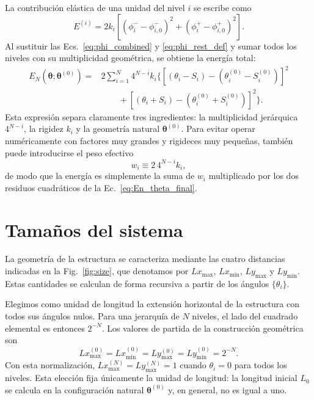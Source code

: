 \documentclass[11pt,a4paper]{article}
\begin{document}
La contribución elástica de una unidad del nivel $i$ se escribe como
\begin{equation}
E^{(i)}
=2k_i\left[
\left(\phi_i^--\phi_{i,0}^-\right)^2
+
\left(\phi_i^+-\phi_{i,0}^+\right)^2
\right].
\label{eq:Ei_phi}
\end{equation}
Al sustituir las Ecs.~\eqref{eq:phi_combined} y
\eqref{eq:phi_rest_def} y sumar todos los niveles con su
multiplicidad geométrica, se obtiene la energía total:
\begin{equation}
\boxed{
\begin{aligned}
E_N(\boldsymbol{\theta};\boldsymbol{\theta}^{(0)})
={}&2\sum_{i=1}^{N}4^{N-i}k_i
\Bigg\{
\left[
(\theta_i-S_i)-(\theta_i^{(0)}-S_i^{(0)})
\right]^2
\\[-0.2em]
&\qquad+
\left[
(\theta_i+S_i)-(\theta_i^{(0)}+S_i^{(0)})
\right]^2
\Bigg\}.
\end{aligned}
}
\label{eq:En_theta_final}
\end{equation}
Esta expresión separa claramente tres ingredientes: la multiplicidad
jerárquica $4^{N-i}$, la rigidez $k_i$ y la geometría natural
$\boldsymbol{\theta}^{(0)}$. Para evitar operar numéricamente con
factores muy grandes y rigideces muy pequeñas, también puede
introducirse el peso efectivo
\begin{equation}
w_i\equiv 2\,4^{N-i}k_i,
\label{eq:effective_weight}
\end{equation}
de modo que la energía es simplemente la suma de $w_i$ multiplicado
por los dos residuos cuadráticos de la Ec.~\eqref{eq:En_theta_final}.

\section{Tamaños del sistema}
\label{sec:size}

La geometría de la estructura se caracteriza mediante las cuatro
distancias indicadas en la Fig.~\ref{fig:size}, que denotamos por
$Lx_{\max}$, $Lx_{\min}$, $Ly_{\max}$ y $Ly_{\min}$.
Estas cantidades se calculan de forma recursiva a partir de los
ángulos $\{\theta_i\}$.

Elegimos como unidad de longitud la extensión horizontal de la
estructura con todos sus ángulos nulos. Para una jerarquía de
$N$ niveles, el lado del cuadrado elemental es entonces $2^{-N}$.
Los valores de partida de la construcción geométrica son
\begin{equation}
Lx_{\max}^{(0)}=Lx_{\min}^{(0)}
=Ly_{\max}^{(0)}=Ly_{\min}^{(0)}=2^{-N}.
\label{eq:size_base}
\end{equation}
Con esta normalización,
$Lx_{\max}^{(N)}=Ly_{\max}^{(N)}=1$
cuando $\theta_i=0$ para todos los niveles. Esta elección fija
únicamente la unidad de longitud: la longitud inicial $L_0$ se
calcula en la configuración natural $\boldsymbol{\theta}^{(0)}$
y, en general, no es igual a uno.
\end{document}

